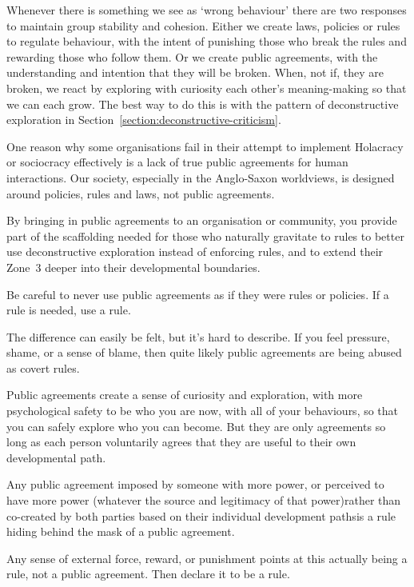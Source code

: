 Whenever there is something we see as ‘wrong behaviour’ there are two responses to maintain group stability and cohesion. Either we create laws, policies or rules to regulate behaviour, with the intent of punishing those who break the rules and rewarding those who follow them. Or we create public agreements, with the understanding and intention that they will be broken. When, not if, they are broken, we react by exploring with curiosity each other's meaning\hyp{}making so that we can each grow. The best way to do this is with the pattern of deconstructive exploration in Section~\ref{section:deconstructive-criticism}.


One reason why some organisations fail in their attempt to implement Holacracy  or sociocracy  effectively is a lack of true public agreements for human interactions. Our society, especially in the Anglo-Saxon worldviews, is designed around policies, rules and laws, not public agreements.


By bringing in public agreements to an organisation or community, you provide part of the scaffolding needed for those who naturally gravitate to rules to better use deconstructive exploration instead of enforcing rules, and to extend their Zone~3 deeper into their developmental boundaries. 


Be careful to never use public agreements as if they were rules or policies. If a rule is needed, use a rule. 


The difference can easily be felt, but it’s hard to describe. If you feel pressure, shame, or a sense of blame, then quite likely public agreements are being abused as covert rules. 


Public agreements create a sense of curiosity and exploration, with more psychological safety to be who you are now, with all of your behaviours, so that you can safely explore who you can become. But they are only agreements so long as each person voluntarily agrees that they are useful to their own developmental path.


Any public agreement imposed by someone with more power, or perceived to have more power (whatever the source and legitimacy of that power)\textemdash rather than co-created by both parties based on their individual development paths\textemdash is a rule hiding behind the mask of a public agreement. 


Any sense of external force, reward, or punishment points at this actually being a rule, not a public agreement. Then declare it to be a rule. 


